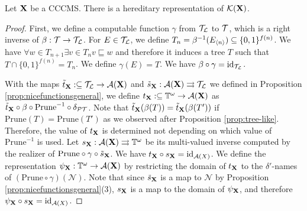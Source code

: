 \documentclass{eptcs-modified}
\begin{document}
\begin{theorem}
\label{theo:hereditary}Let $\mathbf{X}$ be a CCCMS.
There is a hereditary representation of $\mathcal{K}(\mathbf{X})$.
\begin{proof}
  First, we define a computable function $\gamma$ from $\mathcal{T}_\mathcal{L}$ to $\mathcal{T}$, which is a right inverse of $\beta:\mathcal{T} \to \mathcal{T}_\mathcal{L}$.
  For  $E \in \mathcal{T}_\mathcal{L}$, we define $T_n  = \beta^{-1}({{E_{{\langle n\rangle}}}}) \subseteq \{0,1\}^{f(n)}$.
We have $\forall w \in T_{n+1} \exists v \in T_n v \sqsubseteq w$ and
therefore it induces a tree $T$ such that $T \cap \{0,1\}^{f(n)} = T_n$.  We define $\gamma(E) = T$.
We have $\beta \circ \gamma = \mathrm{id}_{\mathcal{T}_\mathcal{L}}$.

With the maps $\tilde{t}_{\mathbf{X}} :\subseteq \mathcal{T}_\mathcal{L} \to \mathcal{A}(\mathbf{X})$ and $\tilde{s}_{\mathbf{X}}: {\mathcal{A}}(\mathbf{X}) \rightrightarrows \mathcal{T}_\mathcal{L}$
we defined in Proposition \ref{prop:nicefunctionsgeneral},
we define $t_{\mathbf{X}} :\subseteq \mathbb{T}^\omega \to \mathcal{A}(\mathbf{X})$ as
$\tilde{t}_{\mathbf{X}} \circ \beta \circ \textrm{Prune}^{-1} \circ \delta_{\mathcal{PT}}$.
Note that
$\tilde{t}_{\mathbf{X}}(\beta(T)) = \tilde{t}_{\mathbf{X}}(\beta(T'))$ if $\textrm{Prune}(T) = \textrm{Prune}(T')$ as we observed
after Proposition \ref{prop:tree-like}.  Therefore,
the value of $t_{\mathbf{X}}$ is determined not depending on which value of $\textrm{Prune}^{-1}$
is used.  Let $s_{\mathbf{X}} : \mathcal{A}(\mathbf{X}) \rightrightarrows \mathbb{T}^\omega$ be its multi-valued inverse
computed by the realizer of $\textrm{Prune} \circ \gamma \circ \tilde{s}_{\mathbf{X}}$.
We have $t_{\mathbf{X}} \circ s_{\mathbf{X}} = \textrm{id}_{\mathcal{A}(X)}$.
We define the representation $\psi_{\mathbf{X}} : \mathbb{T}^\omega \to \mathcal{A}(\mathbf{X})$ by restricting
the domain of $t_{\mathbf{X}}$ to the $\delta'$-names of $(\textrm{Prune}\circ \gamma)(\mathcal{N})$.
Note that since $\tilde{s}_{\mathbf{X}}$ is a map to $\mathcal{N}$
by Proposition \ref{prop:nicefunctionsgeneral}(3),
$s_{\mathbf{X}}$ is a map to the domain of $\psi_{\mathbf{X}}$, and therefore $\psi_{\mathbf{X}} \circ s_{\mathbf{X}} = \textrm{id}_{\mathcal{A}(X)}$.









\end{proof}
\end{theorem}
\end{document}
